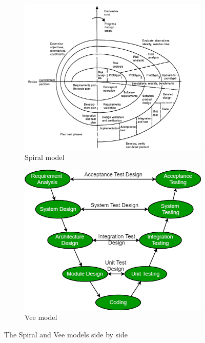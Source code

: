 \begin{figure}[H]
\centering
\begin{subfigure}{0.5\textwidth}
  \centering
  \includegraphics[width=.4\linewidth]{images/Spiral Model.png}
  \caption{Spiral model \cite{spiralmode;}}
  \label{fig:sub1}
\end{subfigure}%
\begin{subfigure}{0.5\textwidth}
  \centering
  \includegraphics[width=.4\linewidth]{images/vee.png}
  \caption{Vee model \cite{geeksforgeeks_2023}}
  \label{fig:sub2}
\end{subfigure}
\caption{The Spiral and Vee models side by side}
\label{fig:test}
\end{figure}

